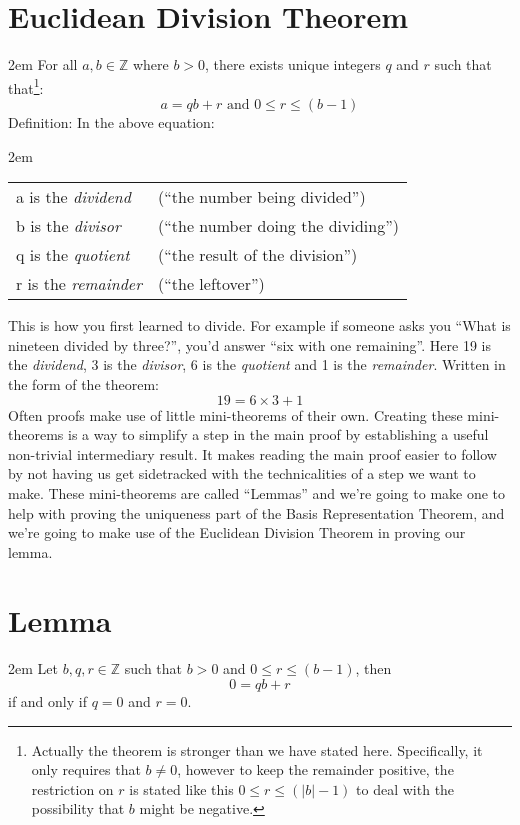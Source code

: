 \documentclass{article}
\newenvironment{jprIn}{\begin{adjustwidth}{2em}{}}{\end{adjustwidth}}
\begin{document}
\section*{Euclidean Division Theorem}
\begin{jprIn}
For all $a,b\in{}\mathbb{Z}$ where $b>0$, there exists unique integers $q$ and $r$ such
that
that\footnote{Actually the theorem is stronger than we have stated here. Specifically, it only requires that $b\ne0$, however
to keep the remainder positive, the restriction on $r$ is stated like
this $0 \le r \le (\left|b\right|-1)$ to deal with the possibility that $b$ might be negative.}:
\[a=qb+r  \text{ and } 0\le{}r\le{}(b-1)\]
Definition: In the above equation:
\begin{jprIn}
\begin{tabular}{l l}
a is the \emph{dividend} & (``the number being divided'')\\
b is the \emph{divisor} & (``the number doing the dividing'')\\
q is the \emph{quotient} & (``the result of the division'')\\
r is the \emph{remainder} & (``the leftover'')
\end{tabular}
\end{jprIn}
\end{jprIn}
This is how you first learned to divide.
For example if someone asks you ``What is nineteen divided by three?'', you’d
answer ``six with one remaining''. Here 19 is the \emph{dividend},  3 is the \emph{divisor},
6 is the \emph{quotient} and 1 is the \emph{remainder}. Written in the form of the theorem:
\[19=6\times3+1\]
Often proofs make use of little mini-theorems of their own.
Creating these mini-theorems is a way to simplify a step in
the main proof by establishing a useful non-trivial
intermediary result. It makes reading the main proof
easier to follow by not having us get sidetracked with
the technicalities of a step we want to make.
These mini-theorems are called ``Lemmas''
and we’re going to make one to help with proving the uniqueness part
of the Basis Representation Theorem, and we're going to make use of the
Euclidean Division Theorem in proving our lemma.

\section*{Lemma}
\begin{jprIn}
Let $b, q, r \in{} \mathbb{Z}$ such that $b>0$ and $0\le{}r\le(b-1)$, then
\[0=qb+r\]
if and only if $q=0$ and $r=0$.
\end{jprIn}
\end{document}
